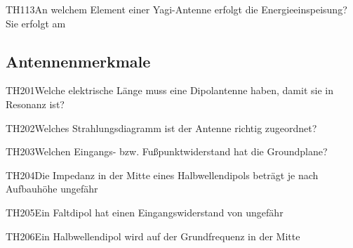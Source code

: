 \begin{question}{TH113}{An welchem Element einer Yagi-Antenne erfolgt die Energieeinspeisung? Sie erfolgt am}
\end{question}

\subsection{Antennenmerkmale}

\begin{question}{TH201}{Welche elektrische Länge muss eine Dipolantenne haben, damit sie in Resonanz ist?}
\end{question}

\begin{question}{TH202}{Welches Strahlungsdiagramm ist der Antenne richtig zugeordnet?}
\end{question}

\begin{question}{TH203}{Welchen Eingangs- bzw. Fußpunktwiderstand hat die Groundplane?}
\end{question}

\begin{question}{TH204}{Die Impedanz in der Mitte eines Halbwellendipols beträgt je nach Aufbauhöhe ungefähr}
\end{question}

\begin{question}{TH205}{Ein Faltdipol hat einen Eingangswiderstand von ungefähr}
\end{question}

\begin{question}{TH206}{Ein Halbwellendipol wird auf der Grundfrequenz in der Mitte}
\end{question}

